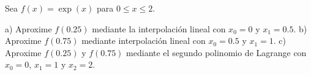 Sea $f\left(x\right)=\exp\left(x\right)$ para $0\leq x\leq 2$.

a) Aproxime $f\left(0.25\right)$ mediante la interpolación lineal con $x_{0}=0$ y $x_{1}=0.5$.
b) Aproxime $f\left(0.75\right)$ mediante interpolación lineal con $x_{0}=0.5$ y $x_{1}=1$.
c) Aproxime $f\left(0.25\right)$ y $f\left(0.75\right)$ mediante el segundo polinomio de Lagrange con $x_{0}=0$, $x_{1}=1$ y $x_{2}=2$.